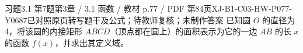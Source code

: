 \par\noindent\begin{minipage}{\linewidth}
\begin{bankitem}{习题3.1 第7题}{第3章 / 3.1 函数 / 教材 p.77 / PDF 第84页}{XJ-B1-C03-HW-P077-Y0687}{已对照原页转写题干及公式；待教师复核；未制作答案}
已知圆 $O$ 的直径为 4，将该圆的内接矩形 $ABCD$（顶点都在圆上）的面积表示为它的一边 $AB$ 的长 $x$ 的函数 $f(x)$，并求出其定义域。
\end{bankitem}
\end{minipage}\par\medskip
